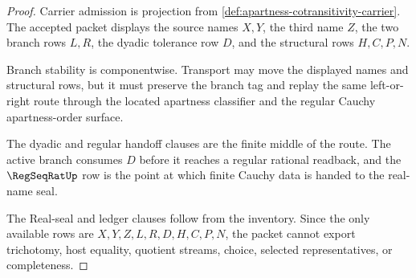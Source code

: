 \begin{proof}
Carrier admission is projection from \autoref{def:apartness-cotransitivity-carrier}. The accepted packet displays the source names $X,Y$, the third name $Z$, the two branch rows $L,R$, the dyadic tolerance row $D$, and the structural rows $H,C,P,N$.

Branch stability is componentwise. Transport may move the displayed names and structural rows, but it must preserve the branch tag and replay the same left-or-right route through the located apartness classifier and the regular Cauchy apartness-order surface.

The dyadic and regular handoff clauses are the finite middle of the route. The active branch consumes $D$ before it reaches a regular rational readback, and the $\RegSeqRatUp$ row is the point at which finite Cauchy data is handed to the real-name seal.

The Real-seal and ledger clauses follow from the inventory. Since the only available rows are $X,Y,Z,L,R,D,H,C,P,N$, the packet cannot export trichotomy, host equality, quotient streams, choice, selected representatives, or completeness.
\end{proof}


